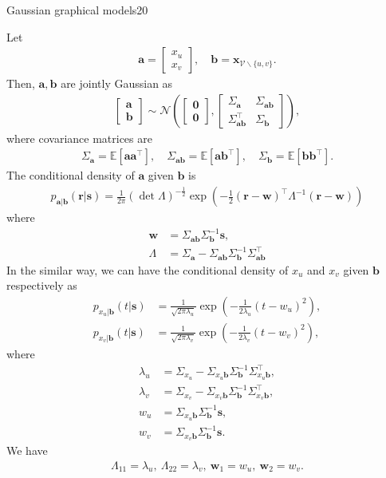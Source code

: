 \documentclass{article}
\begin{document}
\begin{problem}{Gaussian graphical models}{20}
{Let
	\begin{align*}
	\bm{a}=\left[\begin{array}{l} x_u \\ x_v\end{array}\right],\quad \bm{b}=\bm{x}_{\mathcal{V}\backslash\{u,v\}}.	
	\end{align*}
Then, $\bm{a},\bm{b}$ are jointly Gaussian as
	\begin{align*}
	\left[\begin{array}{l} \bm{a}\\\bm{b}\end{array}\right]\sim \mathcal{N}\left(\left[\begin{array}{l}\bm{0}\\\bm{0}\end{array}\right], \left[\begin{array}{ll} \Sigma_{\bm{a}} &\Sigma_{\bm{a}\bm{b}}\\\Sigma_{\bm{a}\bm{b}}^\top &\Sigma_{\bm{b}}\end{array}\right]\right)	,
	\end{align*}
where covariance matrices are
	\begin{align*}
	\Sigma_{\bm{a}}=\mathbb{E}\left[ \bm{a}\bm{a}^\top\right],\quad \Sigma_{\bm{a}\bm{b}}=\mathbb{E}\left[ \bm{a}\bm{b}^\top\right],\quad \Sigma_{\bm{b}}=\mathbb{E}\left[\bm{b}\bm{b}^\top\right].
	\end{align*}
The conditional density of $\bm{a}$ given $\bm{b}$ is
	\begin{align*}
	p_{\bm{a}|\bm{b}}(\bm{r}|\bm{s})=\frac{1}{2\pi} (\det \Lambda )^{-\frac{1}{2}} \exp\left(-\frac{1}{2}(\bm{r}-\bm{w})^\top \Lambda^{-1}(\bm{r}-\bm{w})\right)
	\end{align*}
where
	\begin{align*}
	\bm{w}&=\Sigma_{\bm{a}\bm{b}}\Sigma_{\bm{b}}^{-1}\bm{s},\\
	\Lambda&=\Sigma_{\bm{a}}-\Sigma_{\bm{a}\bm{b}}\Sigma_{\bm{b}}^{-1} \Sigma_{\bm{a}\bm{b}}^\top	
	\end{align*}
In the similar way, we can have the conditional density of $x_u$ and $x_v$ given $\bm{b}$ respectively as
	\begin{align*}
	p_{x_u|\bm{b}}(t|\bm{s})&=\frac{1}{\sqrt{2\pi \lambda_u}}\exp\left(-\frac{1}{2\lambda_u}(t-w_u)^2\right),\\
	p_{x_v|\bm{b}}(t|\bm{s})&=\frac{1}{\sqrt{2\pi \lambda_v}}\exp\left(-\frac{1}{2\lambda_v}(t-w_v)^2\right),
	\end{align*}
where
	\begin{align*}
	\lambda_u&=\Sigma_{x_u}-\Sigma_{x_u\bm{b}}\Sigma_{\bm{b}}^{-1}\Sigma_{x_u\bm{b}}^\top,\\
	\lambda_v&=\Sigma_{x_v}-\Sigma_{x_v\bm{b}}\Sigma_{\bm{b}}^{-1}\Sigma_{x_v\bm{b}}^\top,	\\
	w_u&=\Sigma_{x_u\bm{b}}\Sigma_{\bm{b}}^{-1}\bm{s},\\
	w_v&=\Sigma_{x_v\bm{b}}\Sigma_{\bm{b}}^{-1}\bm{s}.
	\end{align*}
We have
	\begin{align*}
	\Lambda_{11}=\lambda_u,~\Lambda_{22}=\lambda_v,~\bm{w}_1=w_u,~\bm{w}_2=w_v.	
	\end{align*}
	
}
\end{problem}
\end{document}
